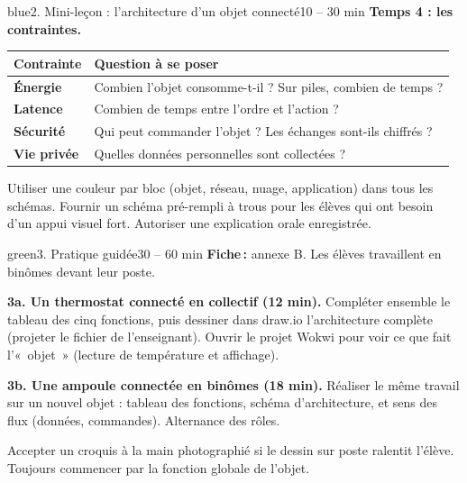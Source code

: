 \documentclass[11pt,a4paper]{article}
\begin{document}
\begin{etape}{blue}{2. Mini-leçon : l'architecture d'un objet connecté}{10 -- 30 min}
\textbf{Temps 4 : les contraintes.}
\begin{center}
\begin{tabularx}{\linewidth}{>{\bfseries}p{3cm}Y}
\toprule
Contrainte & Question à se poser\\
\midrule
Énergie & Combien l'objet consomme-t-il ? Sur piles, combien de temps ?\\
Latence & Combien de temps entre l'ordre et l'action ?\\
Sécurité & Qui peut commander l'objet ? Les échanges sont-ils chiffrés ?\\
Vie privée & Quelles données personnelles sont collectées ?\\
\bottomrule
\end{tabularx}
\end{center}

\begin{astuce}
Utiliser une couleur par bloc (objet, réseau, nuage, application) dans tous les schémas. Fournir un schéma pré-rempli à trous pour les élèves qui ont besoin d'un appui visuel fort. Autoriser une explication orale enregistrée.
\end{astuce}
\end{etape}

\begin{etape}{green}{3. Pratique guidée}{30 -- 60 min}
\textbf{Fiche\,:} annexe B. Les élèves travaillent en binômes devant leur poste.

\textbf{3a. Un thermostat connecté en collectif (12 min).} Compléter ensemble le tableau des cinq fonctions, puis dessiner dans draw.io l'architecture complète (projeter le fichier de l'enseignant). Ouvrir le projet Wokwi pour voir ce que fait l'«~objet~» (lecture de température et affichage).

\textbf{3b. Une ampoule connectée en binômes (18 min).} Réaliser le même travail sur un nouvel objet : tableau des fonctions, schéma d'architecture, et sens des flux (données, commandes). Alternance des rôles.


\begin{astuce}
Accepter un croquis à la main photographié si le dessin sur poste ralentit l'élève. Toujours commencer par la fonction globale de l'objet.
\end{astuce}
\end{etape}
\end{document}
